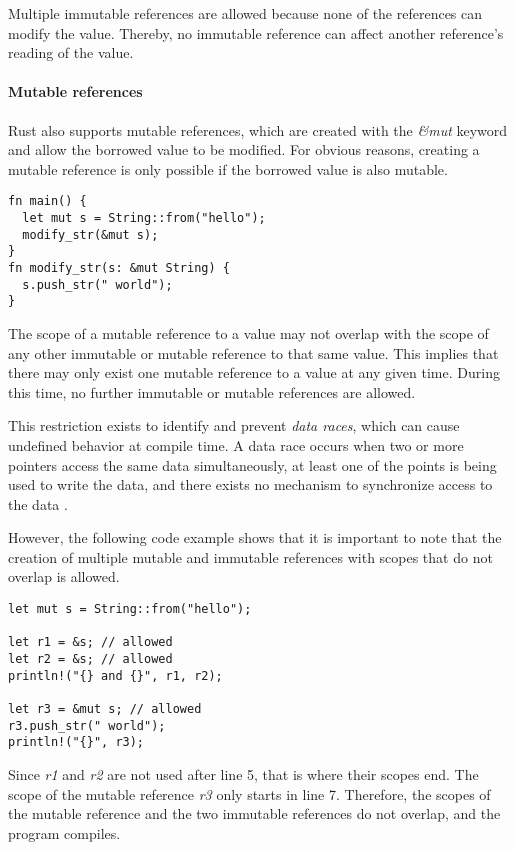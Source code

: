 \documentclass[sigplan,11pt,nonacm]{acmart}
\begin{document}
Multiple immutable references are allowed because none of the references can modify the value.
Thereby, no immutable reference can affect another reference's reading of the value.


\paragraph{Mutable references}

Rust also supports mutable references, which are created with the \emph{&mut} keyword and allow the borrowed value to be modified.
For obvious reasons, creating a mutable reference is only possible if the borrowed value is also mutable.

\begin{lstlisting}
fn main() {
  let mut s = String::from("hello");
  modify_str(&mut s);
}
fn modify_str(s: &mut String) {
  s.push_str(" world");
}
\end{lstlisting}

The scope of a mutable reference to a value may not overlap with the scope of any other immutable or mutable reference to that same value.
This implies that there may only exist one mutable reference to a value at any given time.
During this time, no further immutable or mutable references are allowed.

This restriction exists to identify and prevent \emph{data races}, which can cause undefined behavior at compile time.
A data race occurs when two or more pointers access the same data simultaneously, at least one of the points is being used to write the data, and there exists no mechanism to synchronize access to the data \cite{rust-book}.

However, the following code example \cite{rust-book} shows that it is important to note that the creation of multiple mutable and immutable references with scopes that do not overlap is allowed.

\begin{lstlisting}
let mut s = String::from("hello");

let r1 = &s; // allowed
let r2 = &s; // allowed
println!("{} and {}", r1, r2);

let r3 = &mut s; // allowed
r3.push_str(" world");
println!("{}", r3);
\end{lstlisting}

Since \emph{r1} and \emph{r2} are not used after line 5, that is where their scopes end.
The scope of the mutable reference \emph{r3} only starts in line 7.
Therefore, the scopes of the mutable reference and the two immutable references do not overlap, and the program compiles.
\end{document}
